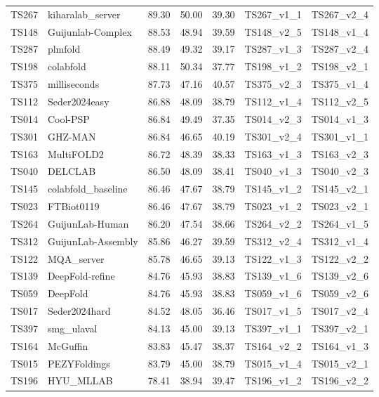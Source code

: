 \begin{table}[ht]
{\begin{tabular}{llrrrll}
TS267 & kiharalab\_server & 89.30 & 50.00 & 39.30 & TS267\_v1\_1 & TS267\_v2\_4 \\ 
TS148 & Guijunlab-Complex & 88.53 & 48.94 & 39.59 & TS148\_v2\_5 & TS148\_v1\_4 \\ 
TS287 & plmfold & 88.49 & 49.32 & 39.17 & TS287\_v1\_3 & TS287\_v2\_4 \\ 
TS198 & colabfold & 88.11 & 50.34 & 37.77 & TS198\_v1\_2 & TS198\_v2\_1 \\ 
TS375 & milliseconds & 87.73 & 47.16 & 40.57 & TS375\_v2\_3 & TS375\_v1\_4 \\ 
TS112 & Seder2024easy & 86.88 & 48.09 & 38.79 & TS112\_v1\_4 & TS112\_v2\_5 \\ 
TS014 & Cool-PSP & 86.84 & 49.49 & 37.35 & TS014\_v2\_3 & TS014\_v1\_3 \\ 
TS301 & GHZ-MAN & 86.84 & 46.65 & 40.19 & TS301\_v2\_4 & TS301\_v1\_1 \\ 
TS163 & MultiFOLD2 & 86.72 & 48.39 & 38.33 & TS163\_v1\_3 & TS163\_v2\_3 \\ 
TS040 & DELCLAB & 86.50 & 48.09 & 38.41 & TS040\_v1\_3 & TS040\_v2\_3 \\ 
TS145 & colabfold\_baseline & 86.46 & 47.67 & 38.79 & TS145\_v1\_2 & TS145\_v2\_1 \\ 
TS023 & FTBiot0119 & 86.46 & 47.67 & 38.79 & TS023\_v1\_2 & TS023\_v2\_1 \\ 
TS264 & GuijunLab-Human & 86.20 & 47.54 & 38.66 & TS264\_v2\_2 & TS264\_v1\_5 \\ 
TS312 & GuijunLab-Assembly & 85.86 & 46.27 & 39.59 & TS312\_v2\_4 & TS312\_v1\_4 \\ 
TS122 & MQA\_server & 85.78 & 46.65 & 39.13 & TS122\_v1\_3 & TS122\_v2\_2 \\ 
TS139 & DeepFold-refine & 84.76 & 45.93 & 38.83 & TS139\_v1\_6 & TS139\_v2\_6 \\ 
TS059 & DeepFold & 84.76 & 45.93 & 38.83 & TS059\_v1\_6 & TS059\_v2\_6 \\ 
TS017 & Seder2024hard & 84.52 & 48.05 & 36.46 & TS017\_v1\_5 & TS017\_v2\_4 \\ 
TS397 & smg\_ulaval & 84.13 & 45.00 & 39.13 & TS397\_v1\_1 & TS397\_v2\_1 \\ 
TS164 & McGuffin & 83.83 & 45.47 & 38.37 & TS164\_v2\_2 & TS164\_v1\_3 \\ 
TS015 & PEZYFoldings & 83.79 & 45.00 & 38.79 & TS015\_v1\_4 & TS015\_v2\_1 \\ 
TS196 & HYU\_MLLAB & 78.41 & 38.94 & 39.47 & TS196\_v1\_2 & TS196\_v2\_2 \\ 

\end{tabular}}
\end{table}
